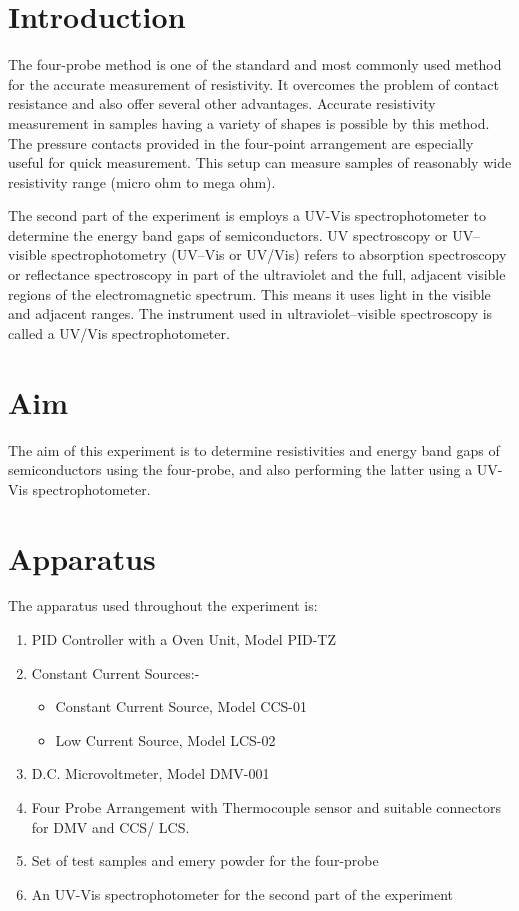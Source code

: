 \documentclass[%
 aip,
 amsmath,amssymb,
 reprint,%
]{revtex4-1}
\begin{document}
\section{Introduction}
The four-probe method is one of the standard and most commonly used method for the accurate measurement of resistivity. It overcomes the problem of contact resistance and also offer several other advantages. Accurate resistivity measurement in samples having a variety of shapes is possible by this method. The pressure contacts provided in the four-point arrangement are especially useful for quick measurement. This setup can measure samples of
reasonably wide resistivity range (micro ohm to mega ohm).
\par
The second part of the experiment is employs a UV-Vis spectrophotometer to determine the energy band gaps of semiconductors. UV spectroscopy or UV–visible spectrophotometry (UV–Vis or UV/Vis) refers to absorption spectroscopy or reflectance spectroscopy in part of the ultraviolet and the full, adjacent visible regions of the electromagnetic spectrum. This means it uses light in the visible and adjacent ranges. The instrument used in ultraviolet–visible spectroscopy is called a UV/Vis spectrophotometer.
\section{Aim}
The aim of this experiment is to determine resistivities and energy band gaps of semiconductors using the four-probe, and also performing the latter using a UV-Vis spectrophotometer.
\section{Apparatus}
The apparatus used throughout the experiment is: 
\begin{enumerate}
    \item PID Controller with a Oven Unit, Model PID-TZ
    \item Constant Current Sources:-
    \begin{itemize}
        \item Constant Current Source, Model CCS-01
        \item Low Current Source, Model LCS-02
    \end{itemize}
    \item D.C. Microvoltmeter, Model DMV-001
    \item Four Probe Arrangement with Thermocouple sensor and suitable connectors for DMV and CCS/ LCS.
    \item Set of test samples and emery powder for the four-probe
    \item An UV-Vis spectrophotometer for the second part of the experiment
\end{enumerate}
\end{document}
